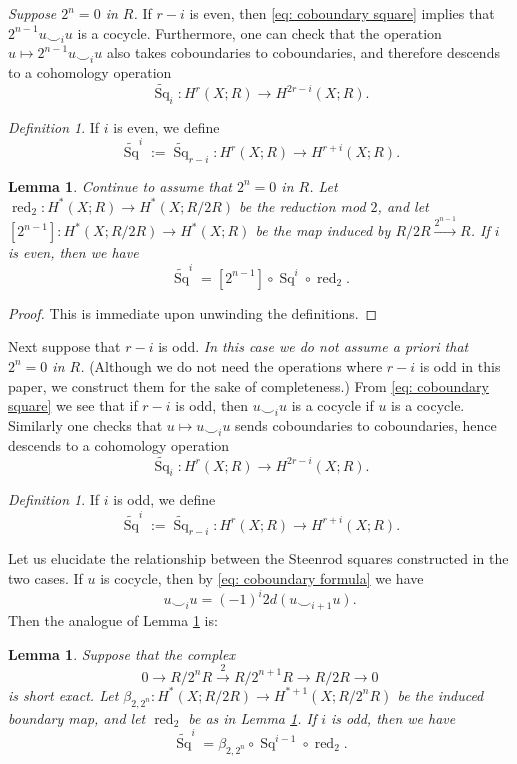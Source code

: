 \documentclass[10pt, reqno]{amsart}
\numberwithin{equation}{subsection}
\newcommand{\wt}[1]{\widetilde{#1}}
\newcommand{\co}{\colon}
\DeclareMathOperator{\Sq}{Sq}
\DeclareMathOperator{\red}{red}
\newtheorem{lemma}[thm]{Lemma}
\theoremstyle{remark}
\newtheorem{defn}[thm]{Definition}
\begin{document}
\emph{Suppose $2^n= 0$ in $R$.} If $r-i$ is even, then \eqref{eq: coboundary square} implies that $2^{n-1} u \smile_i u$ is a cocycle. Furthermore, one can  check that the operation $ u\mapsto 2^{n-1} u \smile_i u$ also takes coboundaries to coboundaries, and therefore descends to a cohomology operation
\[
\wt{\Sq}_i \co H^r(X; R) \rightarrow H^{2r-i}(X; R).
\]

\begin{defn}
If $i$ is even, we define 
\[
\wt{\Sq}^i := \wt{\Sq}_{r-i} \co H^r(X; R) \rightarrow H^{r+i}(X; R).
\]
\end{defn}



\begin{lemma}\label{lemma: top generalized sq}
Continue to assume that $2^n = 0 $ in $R$. Let $\red_2 \co H^*(X; R) \rightarrow H^*(X; R/2R)$ be the reduction mod $2$, and let $[2^{n-1}] \co H^*(X; R/2R) \rightarrow H^*(X; R)$ be the map induced by $R/2R \xrightarrow{2^{n-1}} R$. If $i$ is even, then we have
\[
\wt{\Sq}^i = [2^{n-1}] \circ \Sq^i \circ \red_2.
\]
\end{lemma}

\begin{proof}
This is immediate upon unwinding the definitions. 
\end{proof}



Next suppose that $r-i$ is odd. \emph{In this case we do not assume a priori that $2^n=0$ in $R$.} (Although we do not need the operations where $r-i$ is odd in this paper, we construct them for the sake of completeness.) From \eqref{eq: coboundary square} we see that if  $r-i$ is odd, then $u \smile_i u$ is a cocycle if $u$ is a cocycle. Similarly one checks that $u \mapsto u \smile_i u$ sends coboundaries to coboundaries, hence descends to a cohomology operation
\[
\wt{\Sq}_i \co H^r(X; R) \rightarrow H^{2r-i}(X; R).
\]

\begin{defn}
If $i$ is odd, we define 
\[
\wt{\Sq}^i := \wt{\Sq}_{r-i} \co H^r(X; R) \rightarrow H^{r+i}(X; R).
\]
\end{defn}	

Let us elucidate the relationship between the Steenrod squares constructed in the two cases. If $u$ is cocycle, then by \eqref{eq: coboundary formula} we have 
\[
u \smile_i u = (-1)^{i} 2 d(u \smile_{i+1} u).
\]
Then the analogue of Lemma \ref{lemma: top generalized sq} is:


\begin{lemma} Suppose that the complex
\[
0 \rightarrow R/2^nR \xrightarrow{2} R/2^{n+1}R \rightarrow R/2 R \rightarrow 0
\]
is short exact. Let $\beta_{2,2^n} \co H^*(X; R/2R) \rightarrow H^{*+1}(X; R/2^n R)$ be the induced boundary map, and let $\red_2$ be as in Lemma \ref{lemma: top generalized sq}. If $i$ is odd, then we have
\[
\wt{\Sq}^i   =  \beta_{2,2^n} \circ \Sq^{i-1}  \circ \red_2.
\]	
\end{lemma}
\end{document}
